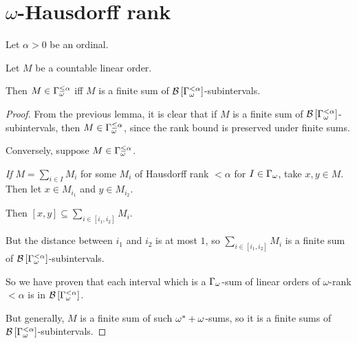 \section{\texorpdfstring{$\omega$}{omega}-Hausdorff rank}

\begin{lemma}
  Let $\alpha > 0$ be an ordinal.

  Let $M$ be a countable linear order.

  Then $M \in \Gamma_{\omega}^{\le \alpha}$ iff $M$ is a finite sum of $\mathcal{B} \left[ {{\Gamma_{\omega}^{< \alpha}}} \right]$-subintervals.
\end{lemma}

\begin{proof}
  From the previous lemma, it is clear that if $M$ is a finite sum of $\mathcal{B} \left[ {{\Gamma_{\omega}^{< \alpha}}} \right]$-subintervals,
  then $M \in \Gamma_{\omega}^{\le \alpha}$, since the rank bound is preserved under finite sums.

  Conversely, suppose $M \in \Gamma_{\omega}^{\le \alpha}$.

  \emph{If} $M = \sum_{i \in I} M_i$ for some $M_i$ of Hausdorff rank $< \alpha$ for $I \in \Gamma_{\omega}$,
  take $x, y \in M$. Then let $x \in M_{i_1}$ and $y \in M_{i_2}$.

  Then $[x, y] \subseteq \sum_{i \in [i_1, i_2]} M_i$.

  But the distance between $i_1$ and $i_2$ is at most $1$, so $\sum_{i \in [i_1, i_2]} M_i$ is a finite sum of
  $\mathcal{B} \left[ {{\Gamma_{\omega}^{< \alpha}}} \right]$-subintervals.

  So we have proven that each interval which is a $\Gamma_{\omega}$-sum of linear orders of
  $\omega$-rank $< \alpha$ is in $\mathcal{B} \left[ {{\Gamma_{\omega}^{< \alpha}}} \right]$.

  But generally, $M$ is a finite sum of such $\omega^\ast + \omega$-sums, so it is a finite sums
  of $\mathcal{B} \left[ {{\Gamma_{\omega}^{< \alpha}}} \right]$-subintervals.
\end{proof}

